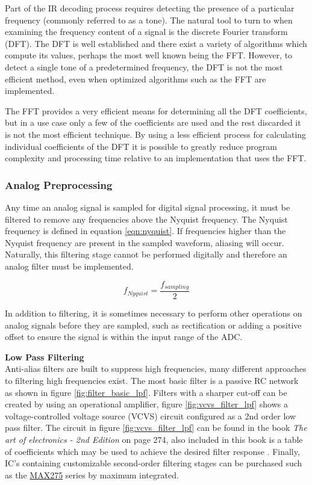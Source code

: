 Part of the IR decoding process requires detecting the presence of a particular frequency (commonly referred to as a tone). The natural tool to turn to when examining the frequency content of a signal is the discrete Fourier transform (DFT). The DFT is well established and there exist a variety of algorithms which compute its values, perhaps the most well known being the FFT. However, to detect a single tone of a predetermined frequency, the DFT is not the most efficient method, even when optimized algorithms such as the FFT are implemented.

The FFT provides a very efficient means for determining all the DFT coefficients, but in a use case only a few of the coefficients are used and the rest discarded it is not the most efficient technique. By using a less efficient process for calculating individual coefficients of the DFT it is possible to greatly reduce program complexity and processing time relative to an implementation that uses the FFT.


\subsubsection{Analog Preprocessing}

Any time an analog signal is sampled for digital signal processing, it must be filtered to remove any frequencies above the Nyquist frequency. The Nyquist frequency is defined in equation \ref{eqn:nyquist}. If frequencies higher than the Nyquist frequency are present in the sampled waveform, aliasing will occur. Naturally, this filtering stage cannot be performed digitally and therefore an analog filter must be implemented.

\begin{equation}
	f_{Nyquist} = \frac{f_{sampling}}{2}
	\label{eqn:nyquist}
\end{equation}


In addition to filtering, it is sometimes necessary to perform other operations on analog signals before they are sampled, such as rectification or adding a positive offset to ensure the signal is within the input range of the ADC.

\textbf{Low Pass Filtering}\\
Anti-alias filters are built to suppress high frequencies, many different approaches to filtering high frequencies exist. The most basic filter is a passive RC network as shown in figure \ref{fig:filter_basic_lpf}. Filters with a sharper cut-off can be created by using an operational amplifier, figure \ref{fig:vcvs_filter_lpf} shows a voltage-controlled voltage source (VCVS) circuit configured as a 2nd order low pass filter. The circuit in figure \ref{fig:vcvs_filter_lpf} can be found in the book \textit{The art of electronics - 2nd Edition} on page 274, also included in this book is a table of coefficients which may be used to achieve the desired filter response \cite{Horowitz1995}. Finally, IC's containing customizable second-order filtering stages can be purchased such as the \href{https://www.maximintegrated.com/en/products/analog/analog-filters/MAX275.html/tb_tab0}{MAX275} series by maximum integrated.

